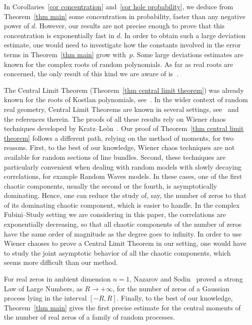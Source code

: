 \documentclass[10pt]{amsart}
\theoremstyle{definition}\newtheorem{defi}[theo]{Definition}\newtheorem{rema}[theo]{Remark}\newtheorem{exam}[theo]{Example}\newtheorem{exem}[theo]{Example}\newtheorem{nota}[theo]{Notation}
\begin{document}
In Corollaries~\ref{cor concentration} and~\ref{cor hole probability}, we deduce from Theorem~\ref{thm main} some concentration in probability, faster than any negative power of $d$. However, our results are not precise enough to prove that this concentration is exponentially fast in $d$. In order to obtain such a large deviation estimate, one would need to investigate how the constants involved in the error terms in Theorem~\ref{thm main} grow with~$p$. Some large deviations estimates are known for the complex roots of random polynomials. As far as real roots are concerned, the only result of this kind we are aware of is~\cite{BDFZ2018}.

The Central Limit Theorem (Theorem~\ref{thm central limit theorem}) was already known for the roots of Kostlan polynomials, see~\cite{Dal2015}. In the wider context of random real geometry, Central Limit Theorems are known in several settings, see~\cite{AADL2018a,AADL2018b,Ros2019} and the references therein. The proofs of all these results rely on Wiener chaos techniques developed by Kratz--Leòn~\cite{KL2001}. Our proof of Theorem~\ref{thm central limit theorem} follows a different path, relying on the method of moments, for two reasons. First, to the best of our knowledge, Wiener chaos techniques are not available for random sections of line bundles. Second, these techniques are particularly convenient when dealing with random models with slowly decaying correlations, for example Random Waves models. In these cases, one of the first chaotic components, usually the second or the fourth, is asymptotically dominating. Hence, one can reduce the study of, say, the number of zeros to that of its dominating chaotic component, which is easier to handle. In the complex Fubini--Study setting we are considering in this paper, the correlations are exponentially decreasing, so that all chaotic components of the number of zeros have the same order of magnitude as the degree goes to infinity. In order to use Wiener chaoses to prove a Central Limit Theorem in our setting, one would have to study the joint asymptotic behavior of all the chaotic components, which seems more difficult than our method.

For real zeros in ambient dimension $n=1$, Nazarov and Sodin~\cite{NS2016} proved a strong Law of Large Numbers, as $R \to +\infty$, for the number of zeros of a Gaussian process lying in the interval $[-R,R]$. Finally, to the best of our knowledge, Theorem~\ref{thm main} gives the first precise estimate for the central moments of the number of real zeros of a family of random processes.
\end{document}
